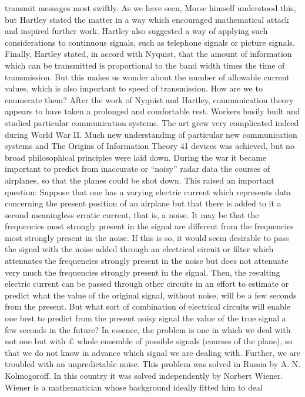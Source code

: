 transmit messages most swiftly. As we have seen, Morse himself
understood this, but Hartley stated the matter in a way which
encouraged mathematical attack and inspired further work. Hartley
also suggested a way of applying such considerations to continuous
signals, such as telephone signals or picture signals.
Finally, Hartley stated, in accord with Nyquist, that the amount
of information which can be transmitted is proportional to the
band width times the time of transmission. But this makes us
wonder about the number of allowable current values, which is also
important to speed of transmission. How are we to enumerate
them?
After the work of Nyquist and Hartley, communication theory
appears to have taken a prolonged and comfortable rest. Workers
busily built and studied particular communication systems. The
art grew very complicated indeed during World War II. Much new
understanding of particular new communication systems and
The Origins of Information Theory 41
devices was achieved, but no broad philosophical principles were
laid down.
During the war it became important to predict from inaccurate
or “noisy” radar data the courses of airplanes, so that the planes
could be shot down. This raised an important question: Suppose
that one has a varying electric current which represents data concerning
the present position of an airplane but that there is added
to it a second meaningless erratic current, that is, a noise. It may
be that the frequencies most strongly present in the signal are
different from the frequencies most strongly present in the noise.
If this is so, it would seem desirable to pass the signal with the noise
added through an electrical circuit or filter which attenuates the
frequencies strongly present in the noise but does not attenuate
very much the frequencies strongly present in the signal. Then, the
resulting electric current can be passed through other circuits in
an effort to estimate or predict what the value of the original signal,
without noise, will be a few seconds from the present. But what
sort of combination of electrical circuits will enable one best to
predict from the present noisy signal the value of the true signal
a few seconds in the future?
In essence, the problem is one in which we deal with not one but
with £ whole ensemble of possible signals (courses of the plane),
so that we do not know in advance which signal we are dealing
with. Further, we are troubled with an unpredictable noise.
This problem was solved in Russia by A. N. Kolmogoroff. In this
country it was solved independently by Norbert Wiener. Wiener
is a mathematician whose background ideally fitted him to deal
